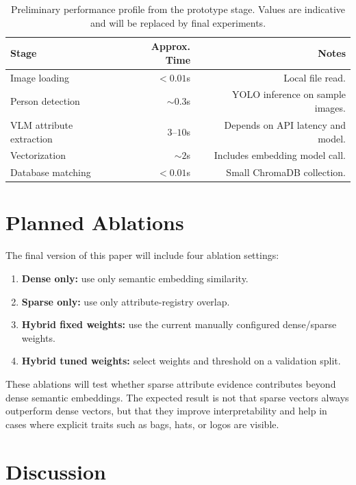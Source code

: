 \begin{table}[htbp]
  \centering
  \caption{Preliminary performance profile from the prototype stage. Values are indicative and will be replaced by final experiments.}
  \label{tab:paper1-performance}
  \begin{tabular}{lrr}
    \toprule
    Stage & Approx. Time & Notes \\
    \midrule
    Image loading & $<0.01$s & Local file read. \\
    Person detection & $\sim0.3$s & YOLO inference on sample images. \\
    VLM attribute extraction & $3$--$10$s & Depends on API latency and model. \\
    Vectorization & $\sim2$s & Includes embedding model call. \\
    Database matching & $<0.01$s & Small ChromaDB collection. \\
    \bottomrule
  \end{tabular}
\end{table}

\section{Planned Ablations}

The final version of this paper will include four ablation settings:

\begin{enumerate}
  \item \textbf{Dense only:} use only semantic embedding similarity.
  \item \textbf{Sparse only:} use only attribute-registry overlap.
  \item \textbf{Hybrid fixed weights:} use the current manually configured dense/sparse weights.
  \item \textbf{Hybrid tuned weights:} select weights and threshold on a validation split.
\end{enumerate}

These ablations will test whether sparse attribute evidence contributes beyond dense semantic embeddings. The expected result is not that sparse vectors always outperform dense vectors, but that they improve interpretability and help in cases where explicit traits such as bags, hats, or logos are visible.

\section{Discussion}

